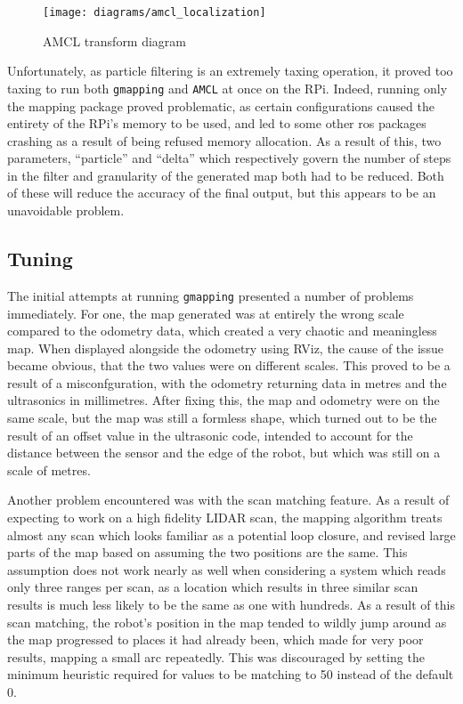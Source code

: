 \begin{figure}[H]
	\centering
	\texttt{[image: diagrams/amcl\_localization]}
	\caption{AMCL transform diagram~\cite{macenski_amcl}}\label{fig:amcl}
\end{figure}

Unfortunately, as particle filtering is an extremely taxing operation, it proved too taxing to run both
\verb|gmapping| and \verb|AMCL| at once on the RPi. Indeed, running only the mapping package proved problematic,
as certain configurations caused the entirety of the RPi's memory to be used, and led to some other ros packages
crashing as a result of being refused memory allocation. As a result of this, two parameters, ``particle'' and
``delta'' which respectively govern the number of steps in the filter and granularity of the generated map both
had to be reduced. Both of these will reduce the accuracy of the final output, but this appears to be an unavoidable problem.

\subsection{Tuning}\label{soft/SLAM/tuning}

The initial attempts at running \verb|gmapping| presented a number of problems immediately. For one, the map
generated was at entirely the wrong scale compared to the odometry data, which created a very chaotic and meaningless
map. When displayed alongside the odometry using RViz, the cause of the issue became obvious, that the two values were
on different scales. This proved to be a result of a misconfguration, with the odometry returning data in metres and
the ultrasonics in millimetres. After fixing this, the map and odometry were on the same scale, but the map was still
a formless shape, which turned out to be the result of an offset value in the ultrasonic code, intended to account
for the distance between the sensor and the edge of the robot, but which was still on a scale of metres.

Another problem encountered was with the scan matching feature. As a result of expecting to work on a high fidelity
LIDAR scan, the mapping algorithm treats almost any scan which looks familiar as a potential loop closure, and revised
large parts of the map based on assuming the two positions are the same. This assumption does not work nearly as well
when considering a system which reads only three ranges per scan, as a location which results in three similar
scan results is much less likely to be the same as one with hundreds. As a result of this scan matching, the robot's
position in the map tended to wildly jump around as the map progressed to places it had already been, which made for
very poor results, mapping a small arc repeatedly. This was discouraged by setting the minimum heuristic required for
values to be matching to 50 instead of the default 0.

